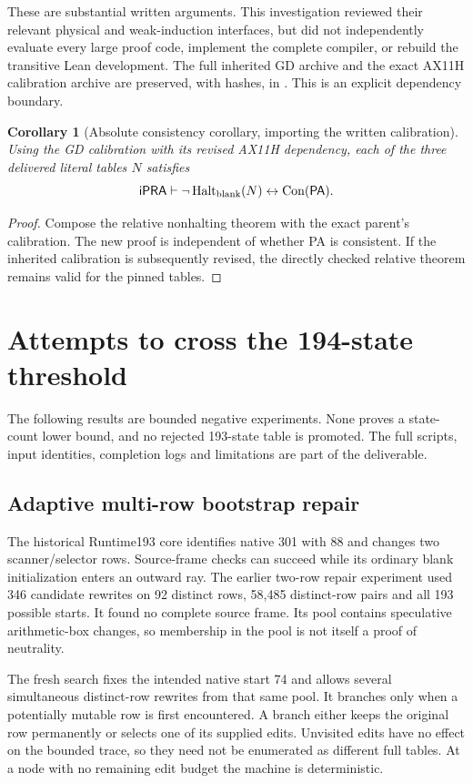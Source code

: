\documentclass[11pt,letterpaper]{article}
\newtheorem{corollary}[theorem]{Corollary}
\newcommand{\ipra}{\mathsf{iPRA}}
\newcommand{\PA}{\mathsf{PA}}
\newcommand{\Con}{\operatorname{Con}}
\newcommand{\Halt}{\operatorname{Halt}}
\newcommand{\file}[1]{\path{#1}}
\begin{document}
These are substantial written arguments. This investigation reviewed
their relevant physical and weak-induction interfaces, but did not
independently evaluate every large proof code, implement the complete
compiler, or rebuild the transitive Lean development. The full inherited
GD archive and the exact AX11H calibration archive are preserved, with
hashes, in \file{references/}. This is an explicit dependency boundary.

\begin{corollary}[Absolute consistency corollary, importing the written calibration]
Using the GD calibration with its revised AX11H dependency, each of the
three delivered literal tables $N$ satisfies
\[
 \ipra\vdash\neg\Halt_{\rm blank}(N)\leftrightarrow\Con(\PA).
\]
\end{corollary}
\begin{proof}
Compose the relative nonhalting theorem with the exact parent's
calibration. The new proof is independent of whether PA is consistent.
If the inherited calibration is subsequently revised, the directly
checked relative theorem remains valid for the pinned tables.
\end{proof}

\section{Attempts to cross the 194-state threshold}
\label{sec:search}

The following results are bounded negative experiments. None proves a
state-count lower bound, and no rejected 193-state table is promoted.
The full scripts, input identities, completion logs and limitations are
part of the deliverable.

\subsection{Adaptive multi-row bootstrap repair}

The historical Runtime193 core identifies native 301 with 88 and changes
two scanner/selector rows. Source-frame checks can succeed while its
ordinary blank initialization enters an outward ray. The earlier
two-row repair experiment used 346 candidate rewrites on 92 distinct
rows, 58,485 distinct-row pairs and all 193 possible starts. It found
no complete source frame. Its pool contains speculative arithmetic-box
changes, so membership in the pool is not itself a proof of neutrality.

The fresh search fixes the intended native start 74 and allows several
simultaneous distinct-row rewrites from that same pool. It branches only
when a potentially mutable row is first encountered. A branch either
keeps the original row permanently or selects one of its supplied edits.
Unvisited edits have no effect on the bounded trace, so they need not
be enumerated as different full tables. At a node with no remaining
edit budget the machine is deterministic.
\end{document}
